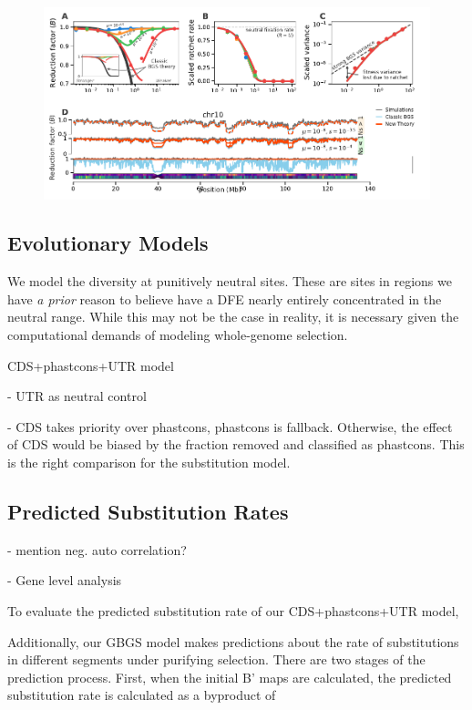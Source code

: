 \documentclass[11pt]{article}
\begin{document}
\begin{figure}[!htb]
  \centering
  \includegraphics{figures/figure1.pdf}
  \caption{}
  \label{fig:figure-1}
\end{figure}


\subsection*{Evolutionary Models}

We model the diversity at punitively neutral sites. These are sites in regions
we have \emph{a prior} reason to believe have a DFE nearly entirely
concentrated in the neutral range. While this may not be the case in reality,
it is necessary given the computational demands of modeling whole-genome
selection. 

CDS+phastcons+UTR model

 - UTR as neutral control

 - CDS takes priority over phastcons, phastcons is fallback. Otherwise, the
   effect of CDS would be biased by the fraction removed and classified as
   phastcons. This is the right comparison for the substitution model.

\subsection*{Predicted Substitution Rates}

- mention neg. auto correlation?

- Gene level analysis

To evaluate the predicted substitution rate of our CDS+phastcons+UTR model, 


Additionally, our GBGS model makes predictions about the rate of substitutions
in different segments under purifying selection. There are two stages of the
prediction process. First, when the initial B' maps are calculated, the
predicted substitution rate is calculated as a byproduct of 
\end{document}
